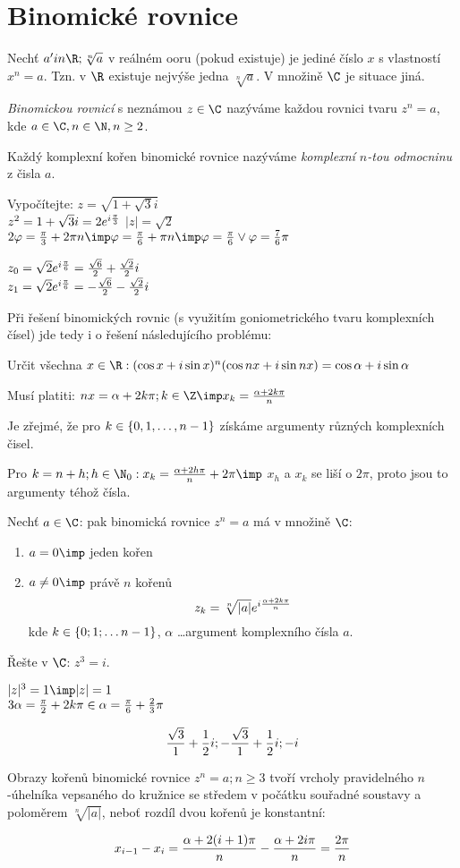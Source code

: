 
\BeginDoc{}
\def\U{{\mathbb U}}
\section{Binomické rovnice}
\Poz Nechť $a'in \R;\sqrt[n]{a}$ v reálném ooru (pokud existuje) je jediné číslo $x$
s vlastností $x^n = a$.
Tzn. v $\R$ existuje nejvýše jedna $\sqrt[n]a$. V množině $\C$ je situace jiná.

\Def \emph{Binomickou rovnicí} s neznámou $z\in\C$ nazýváme každou rovnici tvaru $z^n = a$, kde $a\in\C,n\in\N,n\ge 2$.

Každý komplexní kořen binomické rovnice nazýváme \emph{komplexní $n$-tou odmocninu} z čisla $a$.

\Pr Vypočítejte:
$z = \sqrt{1+\sqrt 3 i}$\\
$z^2 = 1+\sqrt 3 i = 2 e^{i\frac\pi 3}$
$|z| = \sqrt 2$
$2\varphi = \f \pi 3 + 2\pi n \imp \varphi = \f\pi 6 + \pi n \imp \varphi = \f\pi 6 \lor \varphi = \f 7 6 \pi $ 

$z_0 = \sqrt 2 e^{i\frac\pi6} = \frac{\sqrt 6}2 + \frac{\sqrt 2}2 i$\\
$z_1 = \sqrt 2 e^{i\frac\pi6} = -\frac{\sqrt 6}2 -\frac{\sqrt 2}2 i$

\Poz  Při řešení binomických rovnic (s využitím goniometrického tvaru komplexních čísel) jde tedy i
o řešení následujícího problému: 

Určit všechna $x\in\R : (\cos x +i\sin x)^n (\cos nx +i\sin nx) = \cos\alpha +i \sin\alpha$

Musí platiti: $nx = \alpha + 2k\pi;k\in\Z \imp x_k = \f{\alpha + 2k\pi}n$

Je zřejmé, že pro $k\in\left\{{0,1,\dots,n-1}\right\}$ získáme argumenty různých komplexních čisel.

Pro $k = n+h; h \in\N_0 : x_k = \f{\alpha+2h\pi}n+2\pi \imp$ $x_h$ a $x_k$ se liší o $2\pi$, proto jsou to argumenty téhož čísla.

\V Nechť $a\in\C$: pak binomická rovnice $z^n = a$ má v množině $\C$:
\begin{enumerate}
\item $a=0\imp$ jeden kořen
\item $a\neq 0\imp$ právě $n$ kořenů
$$ z_k = \sqrt[n]{|a|} \* e^{i\f{\alpha+2k\pi}n}$$
kde $k\in\left\{{0;1;\dots n-1}\right\}$, $\alpha$ \dots argument komplexního čísla $a$.
\end{enumerate}

\Pr Řešte v $\C$: $z^3 = i$.

$|z|^3 = 1 \imp |z| = 1$\\
$3\alpha = \frac\pi 2 + 2k\pi \in \alpha = \frac\pi 6 + \frac 23\pi$

$$
\frac{\sqrt 3}1+\frac 12 i;
-\frac{\sqrt 3}1+\frac 12 i;
-i
$$

\Poz
Obrazy kořenů binomické rovnice $z^n=a;n\ge 3$
 tvoří vrcholy pravidelného $n$-úhelníka vepsaného
do kružnice se středem v počátku souřadné soustavy a poloměrem $\sqrt[n]{|a|}$, neboť rozdíl dvou
 kořenů je konstantní:

$$ x_{i-1} - x_i = \frac{\alpha + 2(i+1)\pi}n - \frac{\alpha+2i\pi}n = \frac{2\pi}n$$



\EndDoc
